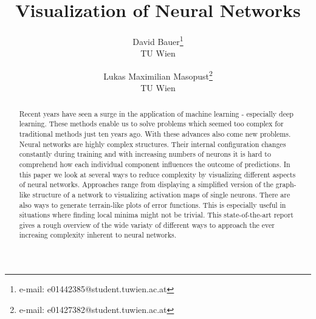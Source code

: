 \documentclass{acmsiggraph}               %
\title{Visualization of Neural Networks}
\author{David Bauer\thanks{e-mail: e01442385@student.tuwien.ac.at}\\ TU Wien %
\and Lukas Maximilian Masopust\thanks{e-mail: e01427382@student.tuwien.ac.at}\\ TU Wien %
}
\begin{document}




\maketitle



\begin{abstract}
Recent years have seen a surge in the application of machine learning - especially deep learning. These methods enable us to solve problems which seemed too complex for traditional methods just ten years ago. With these advances also come new problems. Neural networks are highly complex structures. Their internal configuration changes constantly during training and with increasing numbers of neurons it is hard to comprehend how each individual component influences the outcome of predictions.
In this paper we look at several ways to reduce complexity by visualizing different aspects of neural networks. Approaches range from displaying a simplified version of the graph-like structure of a network to visualizing activation maps of single neurons. There are also ways to generate terrain-like plots of error functions. This is especially useful in situations where finding local minima might not be trivial.
This state-of-the-art report gives a rough overview of the wide variaty of different ways to approach the ever increaing complexity inherent to neural networks.
\end{abstract}
\end{document}
